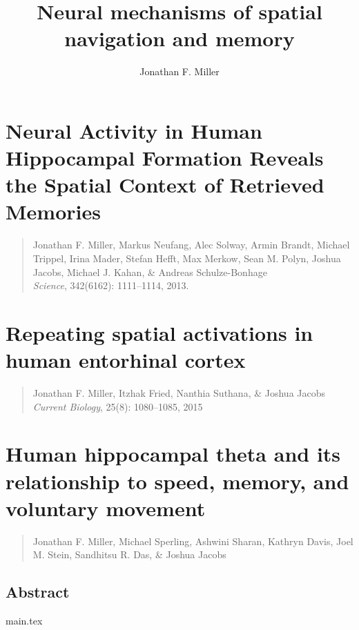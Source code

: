 \documentclass[final,subfig,blackref,approvalform]{drexel-thesis} %
\author{Jonathan F. Miller}
\title{Neural mechanisms of spatial navigation and memory}
\begin{document}


\begin{thesis}
  
    

    \chapter{Neural Activity in Human Hippocampal Formation Reveals the Spatial Context of Retrieved Memories}
    \begin{quotation}
    \singlespacing
    \noindent Jonathan F. Miller, Markus Neufang, Alec Solway, Armin Brandt, Michael Trippel, Irina Mader, Stefan Hefft, Max Merkow, Sean M.  Polyn, Joshua Jacobs, Michael J. Kahan, \& Andreas Schulze-Bonhage  \\ \textit{Science}, 342(6162): 1111--1114, 2013.
    \end{quotation}
    

    \chapter{Repeating spatial activations in human entorhinal cortex}
    \begin{quotation}
    \singlespacing
    \noindent Jonathan F. Miller, Itzhak Fried, Nanthia Suthana, \& Joshua Jacobs \\ \textit{Current Biology}, 25(8): 1080--1085, 2015
    \end{quotation}
    
	
    \chapter{Human hippocampal theta and its relationship to speed, memory, and voluntary movement}
    \begin{quotation}
    \singlespacing
    \noindent Jonathan F. Miller, Michael Sperling, Ashwini Sharan, Kathryn Davis, Joel M. Stein, Sandhitsu R. Das, \& Joshua Jacobs \\ %
    \end{quotation}	

    \section{Abstract}
    
    {main.tex}
    

    


  
\end{thesis}

 


% 
% 
\end{document}
